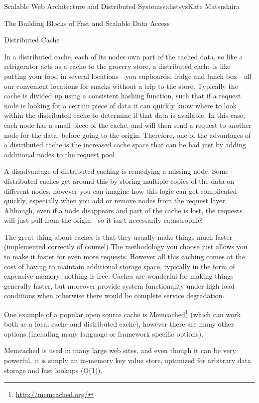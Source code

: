\begin{aosachapter}{Scalable Web Architecture and Distributed Systems}{s:distsys}{Kate Matsudaira}
\begin{aosasect1}{The Building Blocks of Fast and Scalable Data Access}
\begin{aosasect2}{Distributed Cache}

In a distributed cache, each of its nodes own part of the cached data,
so like a refrigerator acts as a cache to the grocery store, a
distributed cache is like putting your food in several locations---you
cupboards, fridge and lunch box---all our convenient locations for
snacks without a trip to the store. Typically the cache is divided up
using a consistent hashing function, such that if a request node is
looking for a certain piece of data it can quickly know where to look
within the distributed cache to determine if that data is
available. In this case, each node has a small piece of the cache, and
will then send a request to another node for the data, before going to
the origin. Therefore, one of the advantages of a distributed cache is
the increased cache space that can be had just by adding additional
nodes to the request pool.

A disadvantage of distributed caching is remedying a missing
node. Some distributed caches get around this by storing multiple
copies of the data on different nodes, however you can imagine how
this logic can get complicated quickly, especially when you add or
remove nodes from the request layer. Although, even if a node
disappears and part of the cache is lost, the requests will just pull
from the origin---so it isn't necessarily catastrophic!


The great thing about caches is that they usually make things much
faster (implemented correctly of course!) The methodology you choose
just allows you to make it faster for even more requests. However all
this caching comes at the cost of having to maintain additional
storage space, typically in the form of expensive memory; nothing is
free. Caches are wonderful for making things generally faster, but
moreover provide system functionality under high load conditions when
otherwise there would be complete service degradation.

One example of a popular open source cache is
Memcached\footnote{\url{http://memcached.org/}} (which can work both
as a local cache and distributed cache), however there are many other
options (including many language or framework specific options).

Memcached is used in many large web sites, and even though it can be
very powerful, it is simply an in-memory key value store, optimized
for arbitrary data storage and fast lookups (O(1)).


\end{aosasect2}
\end{aosasect1}
\end{aosachapter}
